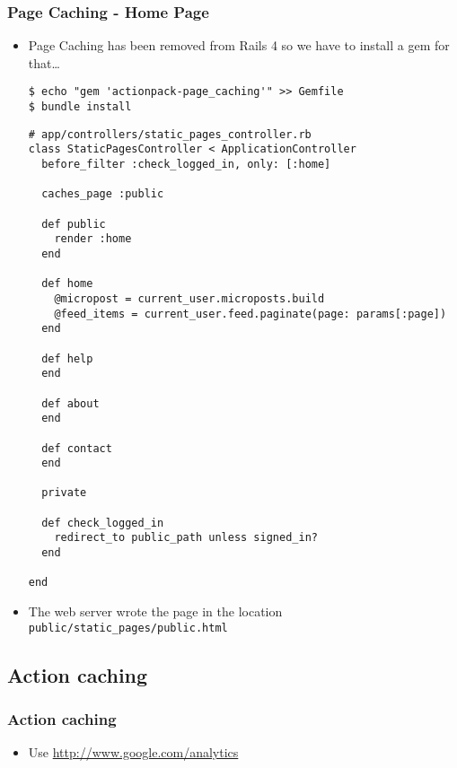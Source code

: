 \documentclass{beamer}
\begin{document}
\begin{frame}
\frametitle{Page Caching - Home Page}
\begin{itemize}

\item Page Caching has been removed from Rails 4 so we have to install a gem for that\dots
\lstset{language=shell}
\begin{lstlisting}[escapechar=!]
$ echo "gem 'actionpack-page_caching'" >> Gemfile
$ bundle install
\end{lstlisting}

\lstset{language=Ruby, style=eclipse}
\begin{lstlisting}
# app/controllers/static_pages_controller.rb
class StaticPagesController < ApplicationController
  before_filter :check_logged_in, only: [:home]

  caches_page :public

  def public
    render :home
  end

  def home
    @micropost = current_user.microposts.build
    @feed_items = current_user.feed.paginate(page: params[:page])
  end

  def help
  end

  def about
  end

  def contact
  end

  private

  def check_logged_in
    redirect_to public_path unless signed_in?
  end

end
\end{lstlisting}

\item The web server wrote the page in the location \texttt{public/static\_pages/public.html}


\end{itemize}
\end{frame}

\subsection{Action caching}
\begin{frame}[fragile]
\frametitle{Action caching}
\begin{itemize}
\item Use \url{http://www.google.com/analytics}
\end{itemize}
\end{frame}
\end{document}
